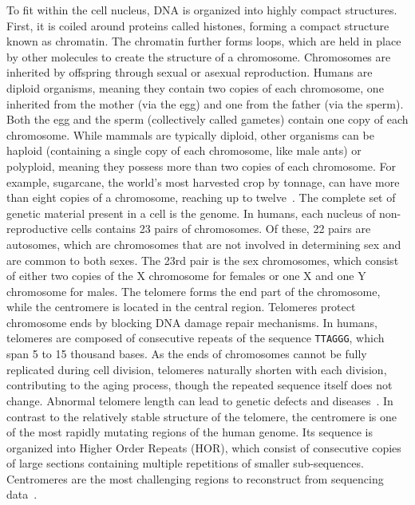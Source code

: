 To fit within the cell nucleus, DNA is organized into highly compact structures. First, it is coiled around proteins called histones, forming a compact structure known as chromatin. The chromatin further forms loops, which are held in place by other molecules to create the structure of a chromosome. Chromosomes are inherited by offspring through sexual or asexual reproduction. Humans are diploid organisms, meaning they contain two copies of each chromosome, one inherited from the mother (via the egg) and one from the father (via the sperm). Both the egg and the sperm (collectively called gametes) contain one copy of each chromosome. While mammals are typically diploid, other organisms can be haploid (containing a single copy of each chromosome, like male ants) or polyploid, meaning they possess more than two copies of each chromosome. For example, sugarcane, the world's most harvested crop by tonnage, can have more than eight copies of a chromosome, reaching up to twelve~\cite{sugarcane}.
The complete set of genetic material present in a cell is the genome. In humans, each nucleus of non-reproductive cells contains 23 pairs of chromosomes. Of these, 22 pairs are autosomes, which are chromosomes that are not involved in determining sex and are common to both sexes. The 23rd pair is the sex chromosomes, which consist of either two copies of the X chromosome for females or one X and one Y chromosome for males. The telomere forms the end part of the chromosome, while the centromere is located in the central region. Telomeres protect chromosome ends by blocking DNA damage repair mechanisms. In humans, telomeres are composed of consecutive repeats of the sequence \texttt{TTAGGG}, which span 5 to 15 thousand bases. As the ends of chromosomes cannot be fully replicated during cell division, telomeres naturally shorten with each division, contributing to the aging process, though the repeated sequence itself does not change. Abnormal telomere length can lead to genetic defects and diseases~\cite{telomeres}. In contrast to the relatively stable structure of the telomere, the centromere is one of the most rapidly mutating regions of the human genome. Its sequence is organized into Higher Order Repeats (\gls{HOR}), which consist of consecutive copies of large sections containing multiple repetitions of smaller sub-sequences. Centromeres are the most challenging regions to reconstruct from sequencing data~\cite{centromeres_eichler}.

